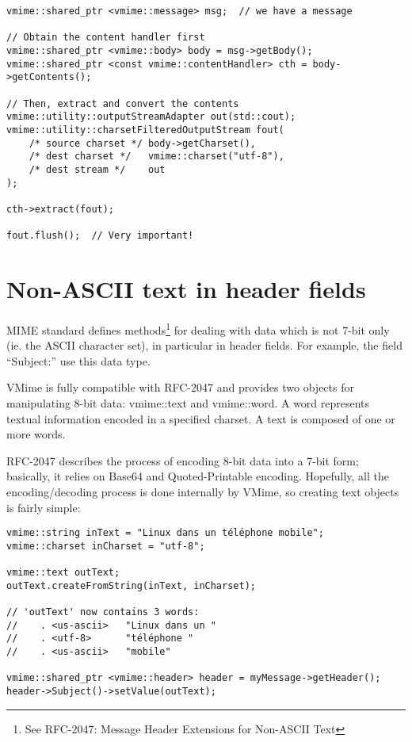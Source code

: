 \begin{lstlisting}[caption={Extracting and converting body contents to a
specified charset}]
vmime::shared_ptr <vmime::message> msg;  // we have a message

// Obtain the content handler first
vmime::shared_ptr <vmime::body> body = msg->getBody();
vmime::shared_ptr <const vmime::contentHandler> cth = body->getContents();

// Then, extract and convert the contents
vmime::utility::outputStreamAdapter out(std::cout);
vmime::utility::charsetFilteredOutputStream fout(
    /* source charset */ body->getCharset(),
    /* dest charset */   vmime::charset("utf-8"),
    /* dest stream */    out
);

cth->extract(fout);

fout.flush();  // Very important!
\end{lstlisting}


\section{Non-ASCII text in header fields}

MIME standard defines methods\footnote{See RFC-2047: Message Header Extensions
for Non-ASCII Text} for dealing with data which is not 7-bit only (ie. the
ASCII character set), in particular in header fields. For example, the field
``Subject:'' use this data type.

VMime is fully compatible with RFC-2047 and provides two objects for
manipulating 8-bit data: {\vcode vmime::text} and {\vcode vmime::word}. A word
represents textual information encoded in a specified charset. A text is
composed of one or more words.

RFC-2047 describes the process of encoding 8-bit data into a 7-bit form;
basically, it relies on Base64 and Quoted-Printable encoding. Hopefully, all
the encoding/decoding process is done internally by VMime, so creating text
objects is fairly simple:

\begin{lstlisting}[caption={Creating \vcode{vmime::text} objects}]
vmime::string inText = "Linux dans un téléphone mobile";
vmime::charset inCharset = "utf-8";

vmime::text outText;
outText.createFromString(inText, inCharset);

// 'outText' now contains 3 words:
//    . <us-ascii>   "Linux dans un "
//    . <utf-8>      "téléphone "
//    . <us-ascii>   "mobile"

vmime::shared_ptr <vmime::header> header = myMessage->getHeader();
header->Subject()->setValue(outText);
\end{lstlisting}

